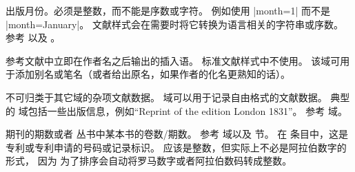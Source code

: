 \begin{fieldlist}

出版月份。必须是整数，而不能是序数或字符。
例如使用 |month={1}| 而不是 |month={January}|。
文献样式会在需要时将它转换为语言相关的字符串或序数。
参考  以及 。




参考文献中立即在作者名之后输出的插入语。
标准文献样式中不使用。
该域可用于添加别名或笔名（或者给出原名，如果作者的化名更熟知的话）。




不可归类于其它域的杂项文献数据。
 域可以用于记录自由格式的文献数据。
典型的  域包括一些出版信息，例如“Reprint of the edition London 1831”。
参考  域。




期刊的期数或者  丛书中某本书的卷数\slash 期数。
参考  域以及  节。
在  条目中，这是专利或专利申请的号码或记录标识。
应该是整数，但实际上不必是阿拉伯数字的形式，
因为 \biber 为了排序会自动将罗马数字或者阿拉伯数码转成整数。


\end{fieldlist}
